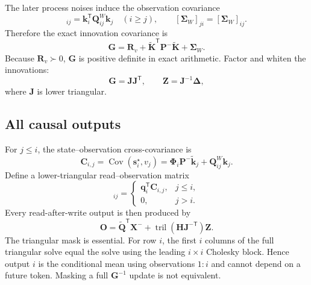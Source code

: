 \documentclass[11pt]{article}
\newcommand{\ve}[1]{\boldsymbol{#1}}
\newcommand{\tr}{\mathsf{T}}
\DeclareMathOperator{\tril}{tril}
\DeclareMathOperator{\Cov}{Cov}
\begin{document}
The later process noises induce the observation covariance
\begin{equation}
  [\ve{\Sigma}_W]_{ij}
  =\ve{k}_i^{\tr}\ve{Q}_{ij}^{W}\ve{k}_j
  \quad(i\geq j),
  \qquad
  [\ve{\Sigma}_W]_{ji}=[\ve{\Sigma}_W]_{ij}.
  \label{eq:sigma-w}
\end{equation}
Therefore the exact innovation covariance is
\begin{equation}
  \ve{G}
  =\ve{R}_v
   +\widetilde{\ve{K}}^{\tr}\ve{P}^-\widetilde{\ve{K}}
   +\ve{\Sigma}_W.
  \label{eq:dynamic-gram}
\end{equation}
Because $\ve{R}_v\succ0$, $\ve{G}$ is positive definite in exact arithmetic.  Factor and whiten
the innovations:
\begin{equation}
  \ve{G}=\ve{J}\ve{J}^{\tr},
  \qquad
  \ve{Z}=\ve{J}^{-1}\ve{\Delta},
  \label{eq:chol-z}
\end{equation}
where $\ve{J}$ is lower triangular.

\subsection{All causal outputs}

For $j\leq i$, the state--observation cross-covariance is
\begin{equation}
  \ve{C}_{i,j}
  =\Cov(\ve{s}_i^\star,v_j)
  =\ve{\Phi}_i\ve{P}^-\widetilde{\ve{k}}_j
   +\ve{Q}_{ij}^{W}\ve{k}_j .
  \label{eq:state-observation-cross}
\end{equation}
Define a lower-triangular read--observation matrix
\begin{equation}
  [\ve{H}]_{ij}
  =
  \begin{cases}
    \ve{q}_i^{\tr}\ve{C}_{i,j},&j\leq i,\\
    0,&j>i.
  \end{cases}
  \label{eq:read-observation-cross}
\end{equation}
Every read-after-write output is then produced by
\begin{equation}
  \boxed{
  \ve{O}
  =\widetilde{\ve{Q}}^{\tr}\ve{X}^-
   +\tril\!\left(\ve{H}\ve{J}^{-\tr}
   \right)\ve{Z}.}
  \label{eq:causal-outputs}
\end{equation}
The triangular mask is essential.  For row $i$, the first $i$ columns of the full triangular
solve equal the solve using the leading $i\times i$ Cholesky block.  Hence output $i$ is the
conditional mean using observations $1{:}i$ and cannot depend on a future token.  Masking a full
$\ve{G}^{-1}$ update is not equivalent.
\end{document}

